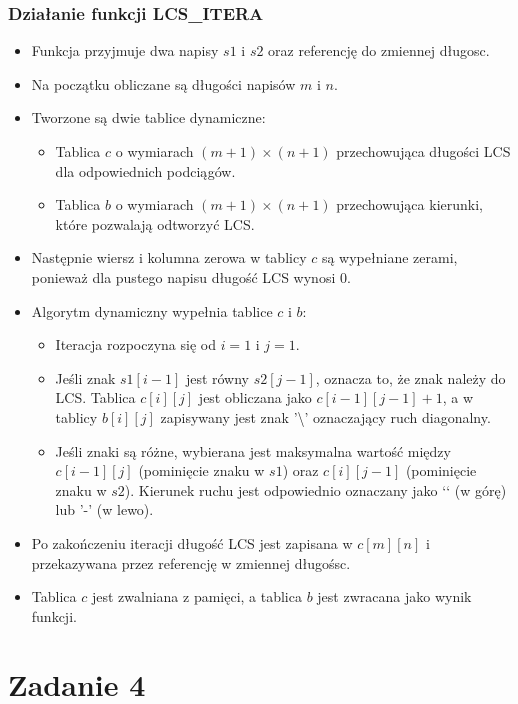 \documentclass{article}
\begin{document}
		\subsubsection*{Działanie funkcji LCS\_ITERA}
		\begin{itemize}
			\item Funkcja przyjmuje dwa napisy $s1$ i $s2$ oraz referencję do zmiennej długosc.
			\item Na początku obliczane są długości napisów $m$ i $n$.
			\item Tworzone są dwie tablice dynamiczne: 
			\begin{itemize} 
				\item Tablica $c$ o wymiarach $(m+1) \times (n+1)$ przechowująca długości LCS dla odpowiednich podciągów. 
				\item Tablica $b$ o wymiarach $(m+1) \times (n+1)$ przechowująca kierunki, które pozwalają odtworzyć LCS.
			\end{itemize}
			\item Następnie wiersz i kolumna zerowa w tablicy $c$ są wypełniane zerami, ponieważ dla pustego napisu długość LCS wynosi $0$. 
			\item Algorytm dynamiczny wypełnia tablice $c$ i $b$: 
			\begin{itemize}
				\item Iteracja rozpoczyna się od $i = 1$ i $j = 1$.
				\item Jeśli znak $s1[i-1]$ jest równy $s2[j-1]$, oznacza to, że znak należy do LCS. Tablica $c[i][j]$ jest obliczana jako $c[i-1][j-1] + 1$, a w tablicy $b[i][j]$ zapisywany jest znak '\textbackslash' oznaczający ruch diagonalny.
				\item Jeśli znaki są różne, wybierana jest maksymalna wartość między $c[i-1][j]$ (pominięcie znaku w $s1$) oraz $c[i][j-1]$ (pominięcie znaku w $s2$). Kierunek ruchu jest odpowiednio oznaczany jako `\textbar` (w górę) lub '-' (w lewo).
			\end{itemize}
			\item Po zakończeniu iteracji długość LCS jest zapisana w $c[m][n]$ i przekazywana przez referencję w zmiennej długośsc.
			\item Tablica $c$ jest zwalniana z pamięci, a tablica $b$ jest zwracana jako wynik funkcji.
		\end{itemize}

	\newpage
	\section*{Zadanie 4}
	
\end{document}
